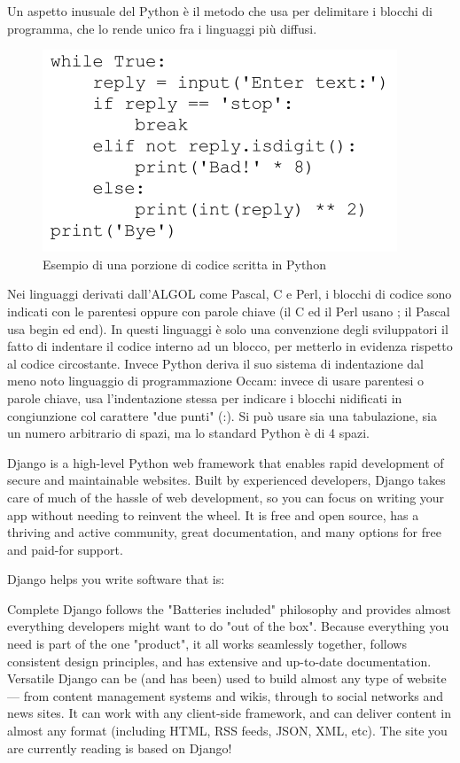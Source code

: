 Un aspetto inusuale del Python è il metodo che usa per delimitare i blocchi di programma, che lo rende unico fra i linguaggi più diffusi.

\begin{figure}[ht!]
    \centering
	\includegraphics[scale=0.5]{images/Python_ex.png}
	\caption{Esempio di una porzione di codice scritta in Python}
\end{figure}

Nei linguaggi derivati dall'ALGOL come Pascal, C e Perl, i blocchi di codice sono indicati con le parentesi oppure con parole chiave 
(il C ed il Perl usano { }; il Pascal usa begin ed end). In questi linguaggi è solo una convenzione degli sviluppatori il fatto di 
indentare il codice interno ad un blocco, per metterlo in evidenza rispetto al codice circostante. Invece Python deriva il suo sistema 
di indentazione dal meno noto linguaggio di programmazione Occam: invece di usare parentesi o parole chiave, usa l'indentazione stessa 
per indicare i blocchi nidificati in congiunzione col carattere "due punti" (:). Si può usare sia una tabulazione, sia un numero
arbitrario di spazi, ma lo standard Python è di 4 spazi. \cite{python-documentation}

Django is a high-level Python web framework that enables rapid development of secure and maintainable websites. Built by experienced 
developers, Django takes care of much of the hassle of web development, so you can focus on writing your app without needing to 
reinvent the wheel. It is free and open source, has a thriving and active community, great documentation, and many options for free 
and paid-for support. 

Django helps you write software that is:

Complete
	Django follows the "Batteries included" philosophy and provides almost everything developers might want to do "out of the box". 
	Because everything you need is part of the one "product", it all works seamlessly together, follows consistent design principles, 
	and has extensive and up-to-date documentation.
Versatile
	Django can be (and has been) used to build almost any type of website — from content management systems and wikis, through to 
	social networks and news sites. It can work with any client-side framework, and can deliver content in almost any format 
	(including HTML, RSS feeds, JSON, XML, etc). The site you are currently reading is based on Django!

